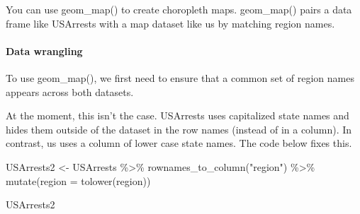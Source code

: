 \documentclass[
]{article}
\newenvironment{Shaded}{\begin{snugshade}}{\end{snugshade}}
\newcommand{\AttributeTok}[1]{\textcolor[rgb]{0.77,0.63,0.00}{#1}}
\newcommand{\FunctionTok}[1]{\textcolor[rgb]{0.00,0.00,0.00}{#1}}
\newcommand{\NormalTok}[1]{#1}
\newcommand{\OtherTok}[1]{\textcolor[rgb]{0.56,0.35,0.01}{#1}}
\newcommand{\SpecialCharTok}[1]{\textcolor[rgb]{0.00,0.00,0.00}{#1}}
\newcommand{\StringTok}[1]{\textcolor[rgb]{0.31,0.60,0.02}{#1}}
\begin{document}
You can use geom\_map() to create choropleth maps. geom\_map() pairs a
data frame like USArrests with a map dataset like us by matching region
names.

\hypertarget{data-wrangling}{%
\paragraph{Data wrangling}\label{data-wrangling}}

To use geom\_map(), we first need to ensure that a common set of region
names appears across both datasets.

At the moment, this isn't the case. USArrests uses capitalized state
names and hides them outside of the dataset in the row names (instead of
in a column). In contrast, us uses a column of lower case state names.
The code below fixes this.

\begin{Shaded}
\begin{Highlighting}[]
\NormalTok{USArrests2 }\OtherTok{\textless{}{-}}\NormalTok{ USArrests }\SpecialCharTok{\%\textgreater{}\%} 
  \FunctionTok{rownames\_to\_column}\NormalTok{(}\StringTok{"region"}\NormalTok{) }\SpecialCharTok{\%\textgreater{}\%} 
  \FunctionTok{mutate}\NormalTok{(}\AttributeTok{region =} \FunctionTok{tolower}\NormalTok{(region))}

\NormalTok{USArrests2}
\end{Highlighting}
\end{Shaded}
\end{document}
